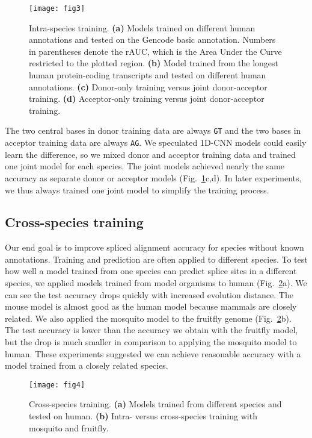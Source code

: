 \documentclass[webpdf,contemporary,large,namedate]{oup-authoring-template}%
\begin{document}
\begin{figure}[tb]
\texttt{[image: fig3]}
\caption{Intra-species training.
{\bf (a)} Models trained on different human annotations
and tested on the Gencode basic annotation.
Numbers in parentheses denote the rAUC, which is the Area Under the Curve restricted to the plotted region.
{\bf (b)} Model trained from the longest human protein-coding transcripts
and tested on different human annotations.
{\bf (c)} Donor-only training versus joint donor-acceptor training.
{\bf (d)} Acceptor-only training versus joint donor-acceptor training.}\label{fig:3}
\end{figure}

The two central bases in donor training data are always {\tt GT}
and the two bases in acceptor training data are always {\tt AG}.
We speculated 1D-CNN models could easily learn the difference, so we mixed donor and acceptor training data
and trained one joint model for each species.
The joint models achieved nearly the same accuracy as separate donor or acceptor models (Fig.~\ref{fig:3}c,d).
In later experiments, we thus always trained one joint model to simplify the training process.

\subsection{Cross-species training}

Our end goal is to improve spliced alignment accuracy for species without known annotations.
Training and prediction are often applied to different species.
To test how well a model trained from one species can predict splice sites in a different species,
we applied models trained from model organisms to human (Fig.~\ref{fig:4}a).
We can see the test accuracy drops quickly with increased evolution distance.
The mouse model is almost good as the human model because mammals are closely related.
We also applied the mosquito model to the fruitfly genome (Fig.~\ref{fig:4}b).
The test accuracy is lower than the accuracy we obtain with the fruitfly model,
but the drop is much smaller in comparison to applying the mosquito model to human.
These experiments suggested we can achieve reasonable accuracy with a model trained from a closely related species.

\begin{figure}[bt]
\texttt{[image: fig4]}
\caption{Cross-species training.
{\bf (a)} Models trained from different species and tested on human.
{\bf (b)} Intra- versus cross-species training with mosquito and fruitfly.}\label{fig:4}
\end{figure}
\end{document}

